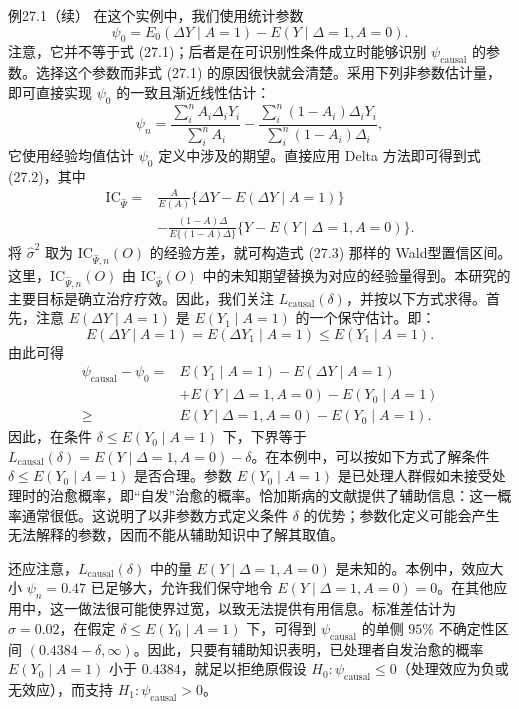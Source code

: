 \begin{bookresult}{例}{27.1（续）}
在这个实例中，我们使用统计参数
\[
 \psi_0=E_0(\Delta Y\mid A=1)-E(Y\mid\Delta=1,A=0).
\]
注意，它并不等于式 (27.1)；后者是在可识别性条件成立时能够识别 $\psi_{\mathrm{causal}}$ 的参数。选择这个参数而非式 (27.1) 的原因很快就会清楚。采用下列非参数估计量，即可直接实现 $\psi_0$ 的一致且渐近线性估计：
\[
 \psi_n=\frac{\sum_i^nA_i\Delta_iY_i}{\sum_i^nA_i}
 -\frac{\sum_i^n(1-A_i)\Delta_iY_i}{\sum_i^n(1-A_i)\Delta_i},
\]
它使用经验均值估计 $\psi_0$ 定义中涉及的期望。直接应用 Delta 方法即可得到式 (27.2)，其中
\[
 \begin{aligned}
 \mathrm{IC}_{\hat\Psi}={}&\frac A{E(A)}\{\Delta Y-E(\Delta Y\mid A=1)\}\\
 &-\frac{(1-A)\Delta}{E\{(1-A)\Delta\}}\{Y-E(Y\mid\Delta=1,A=0)\}.
 \end{aligned}
\]
将 $\hat\sigma^2$ 取为 $\mathrm{IC}_{\hat\Psi,n}(O)$ 的经验方差，就可构造式 (27.3) 那样的 Wald型置信区间。这里，$\mathrm{IC}_{\hat\Psi,n}(O)$ 由 $\mathrm{IC}_{\hat\Psi}(O)$ 中的未知期望替换为对应的经验量得到。本研究的主要目标是确立治疗疗效。因此，我们关注 $L_{\mathrm{causal}}(\delta)$，并按以下方式求得。首先，注意 $E(\Delta Y\mid A=1)$ 是 $E(Y_1\mid A=1)$ 的一个保守估计。即：
\[
 E(\Delta Y\mid A=1)=E(\Delta Y_1\mid A=1)\leq E(Y_1\mid A=1).
\]
由此可得
\[
 \begin{aligned}
 \psi_{\mathrm{causal}}-\psi_0
 ={}&E(Y_1\mid A=1)-E(\Delta Y\mid A=1)\\
 &+E(Y\mid\Delta=1,A=0)-E(Y_0\mid A=1)\\
 \geq{}&E(Y\mid\Delta=1,A=0)-E(Y_0\mid A=1).
 \end{aligned}
\]
因此，在条件 $\delta\leq E(Y_0\mid A=1)$ 下，下界等于 $L_{\mathrm{causal}}(\delta)=E(Y\mid\Delta=1,A=0)-\delta$。在本例中，可以按如下方式了解条件 $\delta\leq E(Y_0\mid A=1)$ 是否合理。参数 $E(Y_0\mid A=1)$ 是已处理人群假如未接受处理时的治愈概率，即“自发”治愈的概率。恰加斯病的文献提供了辅助信息：这一概率通常很低。这说明了以非参数方式定义条件 $\delta$ 的优势；参数化定义可能会产生无法解释的参数，因而不能从辅助知识中了解其取值。

还应注意，$L_{\mathrm{causal}}(\delta)$ 中的量 $E(Y\mid\Delta=1,A=0)$ 是未知的。本例中，效应大小 $\psi_n=0.47$ 已足够大，允许我们保守地令 $E(Y\mid\Delta=1,A=0)=0$。在其他应用中，这一做法很可能使界过宽，以致无法提供有用信息。标准差估计为 $\hat\sigma=0.02$，在假定 $\delta\leq E(Y_0\mid A=1)$ 下，可得到 $\psi_{\mathrm{causal}}$ 的单侧 $95\%$ 不确定性区间 $(0.4384-\delta,\infty)$。因此，只要有辅助知识表明，已处理者自发治愈的概率 $E(Y_0\mid A=1)$ 小于 $0.4384$，就足以拒绝原假设 $H_0:\psi_{\mathrm{causal}}\leq0$（处理效应为负或无效应），而支持 $H_1:\psi_{\mathrm{causal}}>0$。
\end{bookresult}
